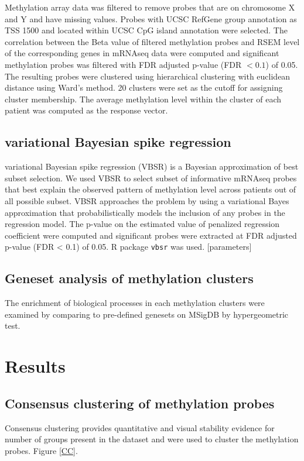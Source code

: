 \documentclass{article}
\begin{document}
Methylation array data was filtered to remove probes that are on chromosome X and Y and have missing values. Probes with UCSC RefGene group annotation as TSS 1500 and located within UCSC CpG island annotation were selected. The correlation between the Beta value of filtered methylation probes and RSEM level of the corresponding genes in mRNAseq data were computed and significant methylation probes was filtered with FDR adjusted p-value (FDR $< 0.1$) of 0.05. The resulting probes were clustered using hierarchical clustering with euclidean distance using Ward's method. 20 clusters were set as the cutoff for assigning cluster membership. The average methylation level within the cluster of each patient was computed as the response vector. 

\subsection{variational Bayesian spike regression}
variational Bayesian spike regression (VBSR) \cite{logsdon2012novel} is a Bayesian approximation of best subset selection. We used VBSR to select subset of informative mRNAseq probes that best explain the observed pattern of methylation level across patients out of all possible subset. VBSR approaches the problem by using a variational Bayes approximation that probabilistically models the inclusion of any probes in the regression model. The p-value on the estimated value of penalized regression coefficient were computed and significant probes were extracted at FDR adjusted p-value (FDR < 0.1) of 0.05. R package \texttt{vbsr} was used. [parameters]

\subsection{Geneset analysis of methylation clusters}
The enrichment of biological processes in each methylation clusters were examined by comparing to pre-defined genesets on MSigDB by hypergeometric test. 

\section{Results}

\subsection{Consensus clustering of methylation probes}

Consensus clustering \citep{monti2003consensus, wilkerson2010consensusclusterplus} provides quantitative and visual stability evidence for number of groups present in the dataset and were used to cluster the methylation probes. Figure \ref{CC}.
\end{document}
